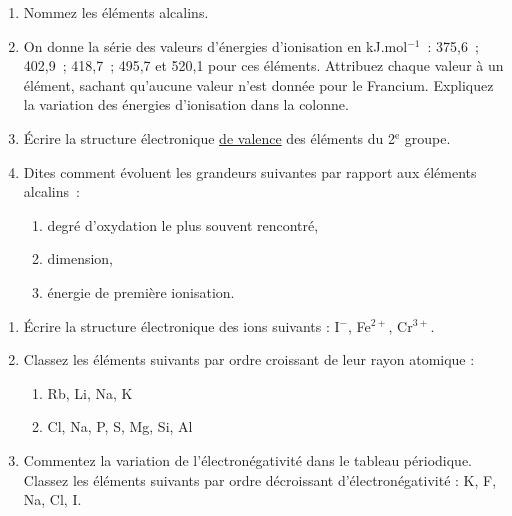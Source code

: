 \begin{enumerate}[\bf 1)]
\item Nommez les \'el\'ements alcalins.
\item On donne la s\'erie des valeurs d'\'energies d'ionisation en kJ.mol$^{-1}$~: 375,6~; 402,9~; 418,7~; 495,7 et 520,1 pour ces \'el\'ements. Attribuez chaque valeur \`a un \'el\'ement, sachant qu'aucune valeur n'est donn\'ee pour le Francium. Expliquez la variation des \'energies d'ionisation dans la colonne.
\item \'Ecrire la structure \'electronique \underline{de valence} des \'el\'ements du 2$^\textrm{e}$ groupe.
\item Dites comment \'evoluent les grandeurs suivantes par rapport aux \'el\'ements alcalins~:
\begin{enumerate}%
\item degr\'e d'oxydation le plus souvent rencontr\'e,
\item dimension,
\item \'energie de premi\`ere ionisation.
\end{enumerate}
\end{enumerate}
\begin{enumerate}[\bf 1)]
\item \'Ecrire la structure \'electronique des ions suivants : I$^-$, Fe$^{2+}$, Cr$^{3+}$.
\item Classez les \'el\'ements suivants par ordre croissant de leur rayon atomique :
\begin{enumerate}%
\item Rb, Li, Na, K
\item Cl, Na, P, S, Mg, Si, Al
\end{enumerate}
\item Commentez la variation de l'\'electron\'egativit\'e dans le tableau p\'eriodique. Classez les \'el\'ements suivants par ordre d\'ecroissant d'\'electron\'egativit\'e : K, F, Na, Cl, I.
\end{enumerate}
%
